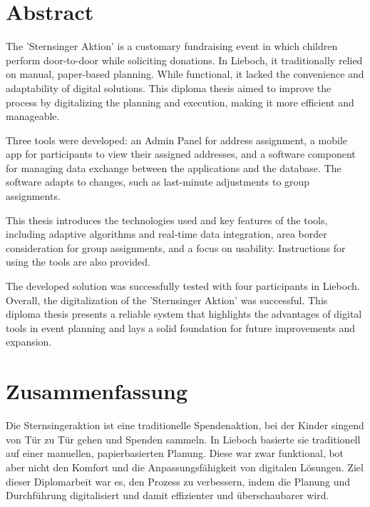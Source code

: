 
\noindent
\setlength{\parindent}{0pt}
\begin{spacing}{1.5}


\section*{Abstract}
The 'Sternsinger Aktion' is a customary fundraising event in which children perform door-to-door while soliciting donations. In Lieboch, it traditionally relied on manual, paper-based planning. While functional, it lacked the convenience and adaptability of digital solutions. This diploma thesis aimed to improve the process by digitalizing the planning and execution, making it more efficient and manageable.\blankLine


Three tools were developed: an Admin Panel for address assignment, a mobile app for participants to view their assigned addresses, and a software component for managing data exchange between the applications and the database. The software adapts to changes, such as last-minute adjustments to group assignments.\blankLine


This thesis introduces the technologies used and key features of the tools, including adaptive algorithms and real-time data integration, area border consideration for group assignments, and a focus on usability. Instructions for using the tools are also provided.\blankLine


The developed solution was successfully tested with four participants in Lieboch. Overall, the digitalization of the 'Sternsinger Aktion' was successful. This diploma thesis presents a reliable system that highlights the advantages of digital tools in event planning and lays a solid foundation for future improvements and expansion.\blankLine


\newpage

\section*{Zusammenfassung}
Die Sternsingeraktion ist eine traditionelle Spendenaktion, bei der Kinder singend von Tür zu Tür gehen und Spenden sammeln. In Lieboch basierte sie traditionell auf einer manuellen, papierbasierten Planung. Diese war zwar funktional, bot aber nicht den Komfort und die Anpassungsfähigkeit von digitalen Lösungen. Ziel dieser Diplomarbeit war es, den Prozess zu verbessern, indem die Planung und Durchführung digitalisiert und damit effizienter und überschaubarer wird.\blankLine


\end{spacing}
